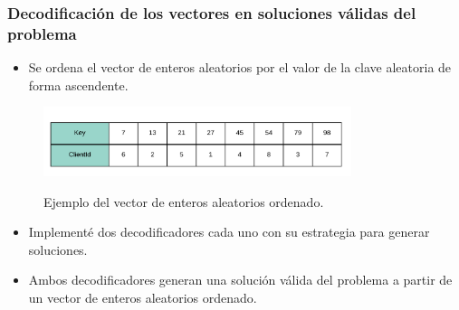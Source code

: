 \documentclass{beamer}
\begin{document}
\begin{frame}
\frametitle{Decodificación de los vectores en soluciones válidas del problema}

\begin{itemize}
    \item Se ordena el vector de enteros aleatorios por el valor de la clave aleatoria de forma ascendente.
    \pause
\end{itemize}

\begin{figure}[h]
	\caption{Ejemplo del vector de enteros aleatorios ordenado.}
	\centering
	\includegraphics[width=9cm]{RandomKeysOrdenado}
	\label{fig:RandomKeysOrdenado}
\end{figure}

\begin{itemize}
    \pause
    \item Implementé dos decodificadores cada uno con su estrategia para generar soluciones.
    \pause
    \item Ambos decodificadores generan una solución válida del problema a partir de un vector de enteros aleatorios ordenado.
\end{itemize}

\end{frame}

\end{document}
